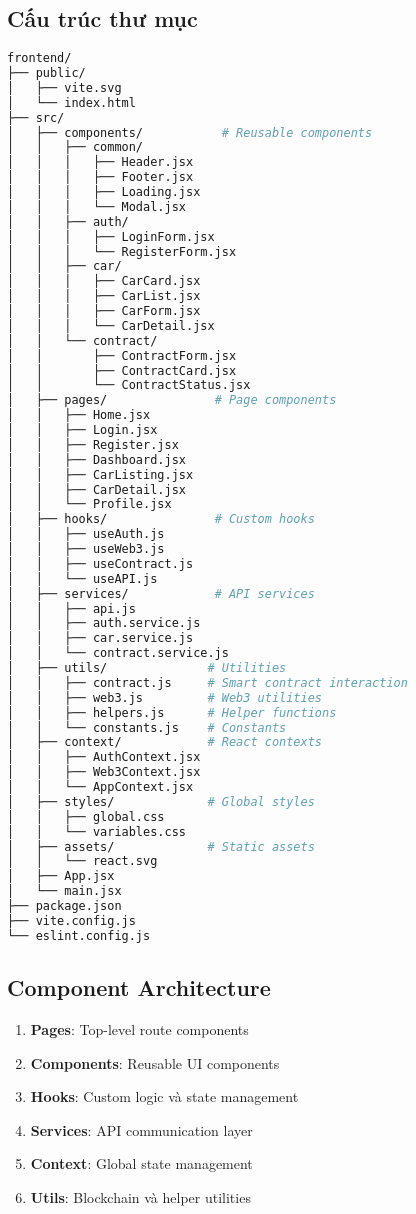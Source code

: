 \documentclass[12pt,a4paper]{article}
\begin{document}
\subsection{Cấu trúc thư mục}
\begin{lstlisting}[language=bash, caption=Cấu trúc project frontend]
frontend/
├── public/
│   ├── vite.svg
│   └── index.html
├── src/
│   ├── components/           # Reusable components
│   │   ├── common/
│   │   │   ├── Header.jsx
│   │   │   ├── Footer.jsx
│   │   │   ├── Loading.jsx
│   │   │   └── Modal.jsx
│   │   ├── auth/
│   │   │   ├── LoginForm.jsx
│   │   │   └── RegisterForm.jsx
│   │   ├── car/
│   │   │   ├── CarCard.jsx
│   │   │   ├── CarList.jsx
│   │   │   ├── CarForm.jsx
│   │   │   └── CarDetail.jsx
│   │   └── contract/
│   │       ├── ContractForm.jsx
│   │       ├── ContractCard.jsx
│   │       └── ContractStatus.jsx
│   ├── pages/               # Page components
│   │   ├── Home.jsx
│   │   ├── Login.jsx
│   │   ├── Register.jsx
│   │   ├── Dashboard.jsx
│   │   ├── CarListing.jsx
│   │   ├── CarDetail.jsx
│   │   └── Profile.jsx
│   ├── hooks/               # Custom hooks
│   │   ├── useAuth.js
│   │   ├── useWeb3.js
│   │   ├── useContract.js
│   │   └── useAPI.js
│   ├── services/            # API services
│   │   ├── api.js
│   │   ├── auth.service.js
│   │   ├── car.service.js
│   │   └── contract.service.js
│   ├── utils/              # Utilities
│   │   ├── contract.js     # Smart contract interaction
│   │   ├── web3.js         # Web3 utilities
│   │   ├── helpers.js      # Helper functions
│   │   └── constants.js    # Constants
│   ├── context/            # React contexts
│   │   ├── AuthContext.jsx
│   │   ├── Web3Context.jsx
│   │   └── AppContext.jsx
│   ├── styles/             # Global styles
│   │   ├── global.css
│   │   └── variables.css
│   ├── assets/             # Static assets
│   │   └── react.svg
│   ├── App.jsx
│   └── main.jsx
├── package.json
├── vite.config.js
└── eslint.config.js
\end{lstlisting}

\subsection{Component Architecture}
\begin{enumerate}
    \item \textbf{Pages}: Top-level route components
    \item \textbf{Components}: Reusable UI components
    \item \textbf{Hooks}: Custom logic và state management
    \item \textbf{Services}: API communication layer
    \item \textbf{Context}: Global state management
    \item \textbf{Utils}: Blockchain và helper utilities
\end{enumerate}
\end{document}
